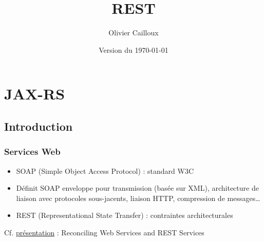 \documentclass[english, french]{beamer}
\title{REST}
\subtitle{}
\author{Olivier Cailloux}
\institute[LAMSADE]{LAMSADE, Université Paris-Dauphine}
\date{Version du \today}
\begin{document}


\begin{frame}[plain]
   \titlepage
\end{frame}
\addtocounter{framenumber}{-1}

\section{JAX-RS}
\subsection{Introduction}
\begin{frame}
	\frametitle{Services Web}
	\begin{itemize}
		\item SOAP (Simple Object Access Protocol) : standard W3C
		\item Définit SOAP enveloppe pour transmission (basée sur XML), architecture de liaison avec protocoles sous-jacents, liaison HTTP, compression de messages…
		\item REST (Representational State Transfer) : contraintes architecturales
	\end{itemize}
	Cf. \href{http://www.w3.org/2005/Talks/1115-hh-k-ecows/}{présentation} : Reconciling Web Services and REST Services
\end{frame}
\end{document}
